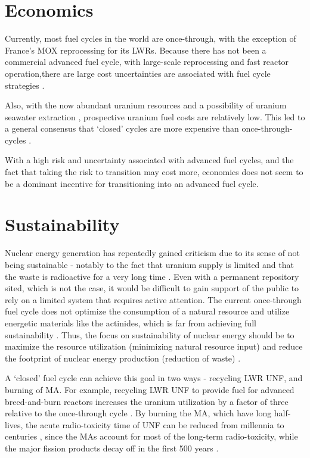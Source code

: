 \section{Economics}
Currently, most fuel cycles in the world are once-through,
with the exception of France's \gls{MOX} reprocessing for its
\glspl{LWR}. Because there has not been a commercial advanced
fuel cycle, with large-scale reprocessing and fast reactor
operation,there are large cost uncertainties are associated
with fuel cycle strategies \cite{d._e._shropshire_advanced_2009}.

Also, with the now abundant uranium resources and a possibility
of uranium seawater extraction \cite{tabushi_extraction_1979},
prospective uranium fuel costs are relatively
low. This led to a general consensus that `closed' cycles are
more expensive than once-through-cycles
\cite{d._e._shropshire_advanced_2009, bunn_economics_2005, charpin_economic_2000}.

With a high risk and uncertainty associated with advanced fuel cycles,
and the fact that taking the risk to transition may cost more,
economics does not seem to be a dominant incentive for transitioning
into an advanced fuel cycle.

\section{Sustainability}
Nuclear energy generation has repeatedly gained criticism due to its
sense of not being sustainable - notably to the fact that uranium
supply is limited and that the waste is radioactive
for a very long time \cite{dittmar_nuclear_2012}. Even with a permanent repository sited,
which is not the case, it would be difficult to gain support of the
public to rely on a limited system that requires active attention.
 The current once-through
fuel cycle does not optimize the consumption of a natural resource
and utilize energetic materials like the actinides, which is far
from achieving full sustainability \cite{poinssot_recycling_2012}.
Thus, the focus on sustainability of nuclear energy should be
to maximize the resource utilization (minimizing natural resource
input) and reduce the footprint of nuclear energy production
(reduction of waste) \cite{poinssot_assessment_2014}.

A `closed' fuel cycle can achieve this goal in two ways -
recycling \gls{LWR} \gls{UNF}, and burning of \gls{MA}.
For example, recycling \gls{LWR} \gls{UNF} to provide
fuel for advanced breed-and-burn reactors increases
the uranium utilization by a factor of three relative
to the once-through cycle \cite{zhang_improved_2018}.
By burning the \gls{MA}, which have long half-lives,
the acute radio-toxicity time of \gls{UNF} can be reduced
from millennia to centuries \cite{nash_1-_2015}, since the
\glspl{MA} account for most of the long-term radio-toxicity,
while the major fission products decay off in the first 500
years \cite{hardin_thermal_2011}.

